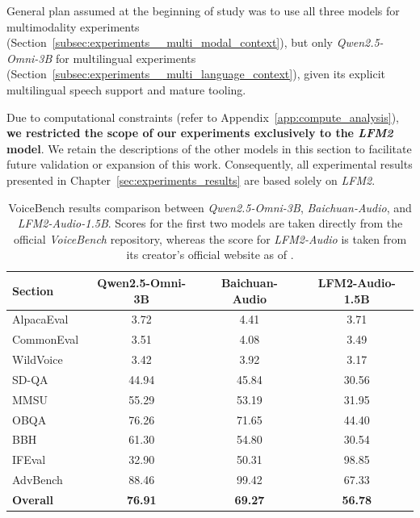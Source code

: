 General plan assumed at the beginning of study was to use all three models for multimodality experiments (Section~\ref{subsec:experiments__multi_modal_context}), but only \textit{Qwen2.5-Omni-3B} for multilingual experiments (Section~\ref{subsec:experiments__multi_language_context}), given its explicit multilingual speech support and mature tooling.

Due to computational constraints (refer to Appendix~\ref{app:compute_analysis}), \textbf{we restricted the scope of our experiments exclusively to the \textit{LFM2} model}. We retain the descriptions of the other models in this section to facilitate future validation or expansion of this work. Consequently, all experimental results presented in Chapter~\ref{sec:experiments_results} are based solely on \textit{LFM2}.

\begin{table}[t!]
\renewcommand{\arraystretch}{1.1}
\centering
\caption{VoiceBench results comparison between \textit{Qwen2.5-Omni-3B}, \textit{Baichuan-Audio}, and \textit{LFM2-Audio-1.5B}. Scores for the first two models are taken directly from the official \textit{VoiceBench} repository, whereas the score for \textit{LFM2-Audio} is taken from its creator's official website as of .}
\begin{tabular}{lccc}

\toprule

\textbf{Section} & \textbf{Qwen2.5-Omni-3B} & \textbf{Baichuan-Audio} & \textbf{LFM2-Audio-1.5B} \\

\midrule

AlpacaEval  & 3.72   & 4.41   & 3.71   \\
CommonEval  & 3.51   & 4.08   & 3.49   \\
WildVoice   & 3.42   & 3.92   & 3.17   \\
SD-QA       & 44.94  & 45.84  & 30.56  \\
MMSU        & 55.29  & 53.19  & 31.95  \\
OBQA        & 76.26  & 71.65  & 44.40  \\
BBH         & 61.30  & 54.80  & 30.54  \\
IFEval      & 32.90  & 50.31  & 98.85  \\
AdvBench    & 88.46 & 99.42  & 67.33  \\
\hline
\textbf{Overall}     & \textbf{76.91}  & \textbf{69.27}  & \textbf{56.78}  \\

\bottomrule

\end{tabular}
\label{tab:experiments__models__voice_bench}
\end{table}

